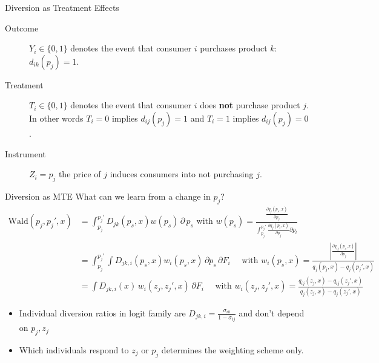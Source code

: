 \documentclass[aspectratio=169,10pt]{beamer}
\begin{document}
\begin{frame}{Diversion as Treatment Effects}
\begin{description}
\item[Outcome] $Y_i \in \{0,1\}$ denotes the event that consumer $i$ purchases product $k$: $d_{ik}(p_j)=1$.
\item[Treatment] $T_i \in \{0,1\}$ denotes the event that consumer $i$ does \textbf{not} purchase product $j$. In other words $T_i = 0$ implies $d_{ij}(p_j)=1$ and $T_i=1$ implies $d_{ij}(p_j)=0$.
\item[Instrument] $Z_i = p_j$ the price of $j$ induces consumers into not purchasing $j$.
\end{description}
\end{frame}

\begin{frame}{Diversion as MTE}
\footnotesize
What can we learn from a change in $p_j$?
\begin{align*}
\text{Wald}(p_j, p_j',x)
&=\int_{p_j}^{p_j'} D_{jk}(p_s,x) w(p_s) \, \partial \, p_s \mbox{ with }
w(p_s)=\frac{  \frac{\partial q_j(p_s,x)}{\partial p_j} }{\int_{p_j}^{p_j'}  \frac{\partial q_j(p_t,x)}{\partial p_j} \partial p_t} \\
\nonumber &=\int_{p_j}^{p_j'} \int D_{jk,i}(p_s,x)  w_i(p_s,x) \, \partial p_s  \, \partial F_i \quad \mbox{ with } w_i(p_s,x) = \frac{\left| \frac{\partial q_{ij}(p_s,x)}{\partial p_j} \right|}{q_j(p_j,x)- q_j(p_j',x)}\\
&= \int D_{jk,i}(x) \, w_i(z_j,z_j',x)  \, \partial F_i \quad \mbox{ with } w_i(z_j,z_j',x) = \frac{q_{ij}(z_j,x)- q_{ij}(z_j',x) }{q_j(z_j,x)- q_j(z_j',x)}
\end{align*}
\begin{itemize}
\item Individual diversion ratios in logit family are $D_{jk,i} = \frac{\sigma_{ik}}{1-\sigma_{ij}}$ and don't depend on $p_j,z_j$
\item Which individuals respond to $z_j$ or $p_j$ determines the weighting scheme only.
\end{itemize}
\end{frame}
\end{document}
